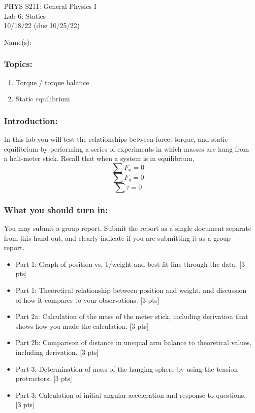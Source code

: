 \documentclass[11pt,letterpaper]{article}
\newcounter{question}[section]
\begin{document}
\setlength{\parindent}{0in}


\begin{flushright}
PHYS S211: General Physics I\\
Lab 6: Statics\\
10/18/22 (due 10/25/22)
\end{flushright}

Name(s):\\

\subsubsection*{Topics:}
\begin{enumerate}
\setlength{\parskip}{3pt}
\item Torque / torque balance
\item Static equilibrium
\end{enumerate}

\subsubsection*{Introduction:}
In this lab you will test the relationships between force, torque, and static equilibrium by performing a series of experiments in which masses are hung from a half-meter stick. Recall that when a system is in equilibrium,
$$\sum{F_x}=0$$
$$\sum{F_y}=0$$
$$\sum\tau=0$$

\subsubsection*{What you should turn in:} 
You may submit a group report. Submit the report as a single document separate from this hand-out, and clearly indicate if you are submitting it as a group report. 

\begin{itemize}
\setlength{\parskip}{3pt}
\item Part 1: Graph of position vs. 1/weight and best-fit line through the data. [3 pts]
\item Part 1: Theoretical relationship between position and weight, and discussion of how it compares to your observations. [3 pts]
\item Part 2a: Calculation of the mass of the meter stick, including derivation that shows how you made the calculation. [3 pts]
\item Part 2b: Comparison of distance in unequal arm balance to theoretical values, including derivation. [3 pts]
\item Part 3: Determination of mass of the hanging sphere by using the tension protractors. [3 pts]
\item Part 3: Calculation of initial angular acceleration and response to questions. [3 pts]
\end{itemize}
\end{document}
